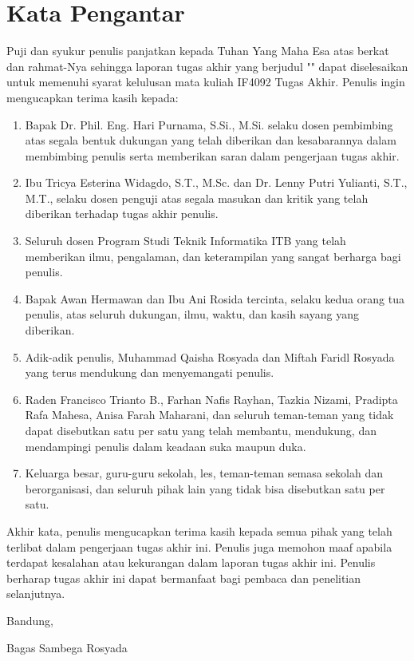 \chapter*{Kata Pengantar}

\sloppy

Puji dan syukur penulis panjatkan kepada Tuhan Yang Maha Esa atas berkat dan rahmat-Nya sehingga laporan tugas akhir yang berjudul "\thetitle" dapat diselesaikan untuk memenuhi syarat kelulusan mata kuliah IF4092 Tugas Akhir.
Penulis ingin mengucapkan terima kasih kepada:

\begin{enumerate}
	\item Bapak Dr. Phil. Eng. Hari Purnama, S.Si., M.Si. selaku dosen pembimbing atas segala bentuk dukungan yang telah diberikan dan kesabarannya dalam membimbing penulis serta memberikan saran dalam pengerjaan tugas akhir.
	\item Ibu Tricya Esterina Widagdo, S.T., M.Sc. dan Dr. Lenny Putri Yulianti, S.T., M.T., selaku dosen penguji atas segala masukan dan kritik yang telah diberikan terhadap tugas akhir penulis.
	\item Seluruh dosen Program Studi Teknik Informatika ITB yang telah memberikan ilmu, pengalaman, dan keterampilan yang sangat berharga bagi penulis.
	\item Bapak Awan Hermawan dan Ibu Ani Rosida tercinta, selaku kedua orang tua penulis, atas seluruh dukungan, ilmu, waktu, dan kasih sayang yang diberikan.
	\item Adik-adik penulis, Muhammad Qaisha Rosyada dan Miftah Faridl Rosyada yang terus mendukung dan menyemangati penulis.
	\item Raden Francisco Trianto B., Farhan Nafis Rayhan, Tazkia Nizami, Pradipta Rafa Mahesa, Anisa Farah Maharani, dan seluruh teman-teman yang tidak dapat disebutkan satu per satu yang telah membantu, mendukung, dan mendampingi penulis dalam keadaan suka maupun duka.
	\item Keluarga besar, guru-guru sekolah, les, teman-teman semasa sekolah dan berorganisasi, dan seluruh pihak lain yang tidak bisa disebutkan satu per satu.
\end{enumerate}

Akhir kata, penulis mengucapkan terima kasih kepada semua pihak yang telah terlibat dalam pengerjaan tugas akhir ini. Penulis juga memohon maaf apabila terdapat kesalahan atau kekurangan dalam laporan tugas akhir ini. Penulis berharap tugas akhir ini dapat bermanfaat bagi pembaca dan penelitian selanjutnya.

\begin{flushright}
	\vspace{0.5cm}
	Bandung, \tanggalpengesahan

	\vspace{1.5cm}

	Bagas Sambega Rosyada
\end{flushright}
